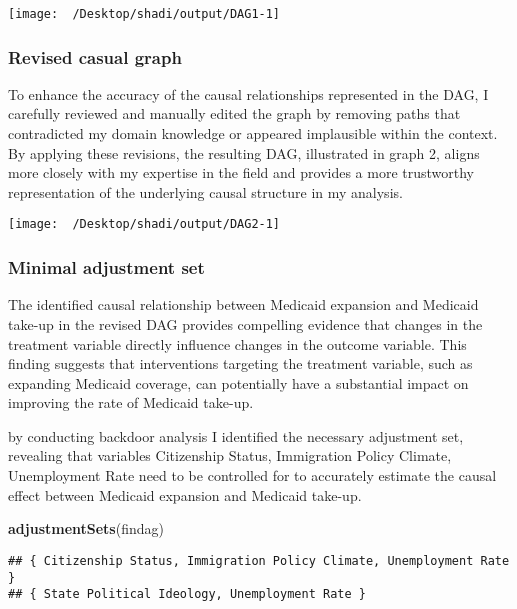 \documentclass[
]{article}
\newenvironment{Shaded}{\begin{snugshade}}{\end{snugshade}}
\newcommand{\FunctionTok}[1]{\textcolor[rgb]{0.13,0.29,0.53}{\textbf{#1}}}
\newcommand{\NormalTok}[1]{#1}
\begin{document}
\begin{center}\texttt{[image: ~/Desktop/shadi/output/DAG1-1]} \end{center}

\hypertarget{revised-casual-graph}{%
\subsubsection{Revised casual graph}\label{revised-casual-graph}}

To enhance the accuracy of the causal relationships represented in the
DAG, I carefully reviewed and manually edited the graph by removing
paths that contradicted my domain knowledge or appeared implausible
within the context. By applying these revisions, the resulting DAG,
illustrated in graph 2, aligns more closely with my expertise in the
field and provides a more trustworthy representation of the underlying
causal structure in my analysis.

\begin{center}\texttt{[image: ~/Desktop/shadi/output/DAG2-1]} \end{center}

\hypertarget{minimal-adjustment-set}{%
\subsubsection{Minimal adjustment set}\label{minimal-adjustment-set}}

The identified causal relationship between Medicaid expansion and
Medicaid take-up in the revised DAG provides compelling evidence that
changes in the treatment variable directly influence changes in the
outcome variable. This finding suggests that interventions targeting the
treatment variable, such as expanding Medicaid coverage, can potentially
have a substantial impact on improving the rate of Medicaid take-up.

by conducting backdoor analysis I identified the necessary adjustment
set, revealing that variables Citizenship Status, Immigration Policy
Climate, Unemployment Rate need to be controlled for to accurately
estimate the causal effect between Medicaid expansion and Medicaid
take-up.

\begin{Shaded}
\begin{Highlighting}[]
\FunctionTok{adjustmentSets}\NormalTok{(findag)}
\end{Highlighting}
\end{Shaded}

\begin{verbatim}
## { Citizenship Status, Immigration Policy Climate, Unemployment Rate }
## { State Political Ideology, Unemployment Rate }
\end{verbatim}
\end{document}
